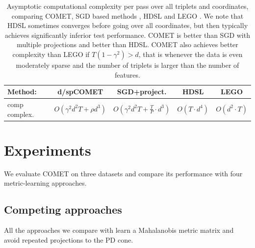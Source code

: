 \documentclass[twoside,11pt]{article}
\begin{document}
\begin{table}[t]
\captionsetup{font=small}
\caption{Asymptotic computational complexity per pass over all triplets and coordinates, comparing COMET, SGD based methods \citep{OASIS, qian}, HDSL \citep{HDSL} and LEGO \citep{lego}. We note that HDSL sometimes converges before going over all coordinates, but then typically achieves significantly inferior test performance. COMET is better than SGD with multiple projections and better than HDSL. COMET also achieves better complexity than LEGO if $T(1-\gamma^2) > d$, that is whenever the data is even moderately sparse and the number of triplets is larger than the number of features.}
\label{comp-complx}
\vskip 0.15in
\begin{center}
\begin{small}
\begin{sc}
\begin{tabular}{lcccc}
\hline
Method: & d/spCOMET  & SGD+project.  & HDSL    & LEGO         \\ 
\hline
comp complex. & $O(\gamma^2 d^2 T +  \rho d^3)$&  $O(\gamma^2 d^2 T + \frac{T}{P} \cdot d^3)$
&   $O( T\cdot  d^4)$ &   $O(d^2 \cdot T)$  \\
\hline
\end{tabular}
\end{sc}
\end{small}
\end{center}
\vskip -0.1in
\end{table}



\section{Experiments}
We evaluate COMET on three datasets and compare its performance with four metric-learning approaches. 

\subsection{Competing approaches}
All the approaches we compare with learn a Mahalanobis metric matrix and avoid repeated projections to the PD cone.
\end{document}
